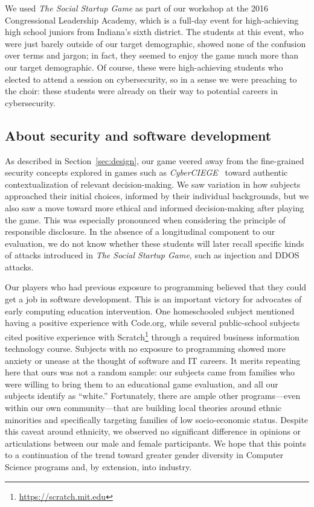 \documentclass[letterpaper]{article}
\begin{document}
We used \textit{The Social Startup Game} as part of our workshop 
at the 2016 Congressional Leadership Academy, which is a full-day event
for high-achieving high school juniors from Indiana's sixth district.
The students at this event, who were just barely outside of our
target demographic, showed none of the confusion over terms
and jargon; in fact, they seemed to enjoy the game much more than our
target demographic. 
Of course, these were high-achieving students who elected
to attend a session on cybersecurity, so in a sense we were preaching
to the choir: these students were already on their way to potential
careers in cybersecurity. 


\subsection{About security and software development}

As described in Section~\ref{sec:design}, our game veered away
from the fine-grained security concepts explored in 
games such as \textit{CyberCIEGE}~\citep{Irvine2005} toward
authentic contextualization of relevant decision-making.
We saw variation in how subjects approached their initial choices,
informed by their individual backgrounds, but we also saw a move toward
more ethical and informed decision-making after playing the game.
This was especially pronounced when considering the principle
of responsible disclosure.
In the absence of a longitudinal component to our evaluation,
we do not know whether these students will later recall specific
kinds of attacks introduced in \textit{The Social Startup Game},
such as injection and DDOS attacks.

Our players who had previous exposure to programming believed that
they could get a job in software development. This is an important
victory for advocates of early computing education intervention.
One homeschooled subject mentioned having a positive experience with
Code.org, while several public-school subjects cited positive experience
with Scratch\footnote{\url{https://scratch.mit.edu}} through a required
business information technology course. Subjects with no exposure to
programming showed more anxiety or unease at the thought of software
and IT careers. It merits repeating here that ours was
not a random sample: our subjects came from families who were willing
to bring them to an educational game evaluation, and all our subjects
identify as ``white.'' Fortunately, there are ample other programs---even
within our own community---that are building local theories around
ethnic minorities and specifically targeting families of low socio-economic 
status.
Despite this caveat around ethnicity, we observed no significant difference
in opinions or articulations between our male and female participants.
We hope that this points to a continuation of the trend toward greater
gender diversity in Computer Science programs and, by extension, into
industry.
\end{document}
